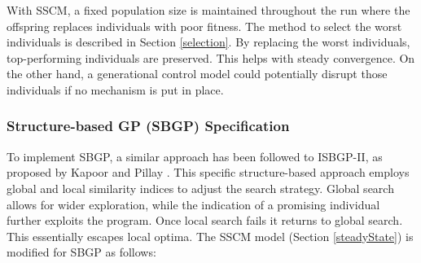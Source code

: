 \documentclass{article}
\begin{document}
With SSCM, a fixed population size is maintained throughout the run where the offspring replaces individuals with poor fitness. The method to select the worst individuals is described in Section \ref{selection}. By replacing the worst individuals, top-performing individuals are preserved. This helps with steady convergence. On the other hand, a generational control model could potentially disrupt those individuals if no mechanism is put in place.

\subsubsection{Structure-based GP (SBGP) Specification}
To implement SBGP, a similar approach has been followed to ISBGP-II, as proposed by Kapoor and Pillay \cite{kapoor_genetic_2024}. This specific structure-based approach employs global and local similarity indices to adjust the search strategy. Global search allows for wider exploration, while the indication of a promising individual further exploits the program. Once local search fails it returns to global search. This essentially escapes local optima. The SSCM model (Section \ref{steadyState}) is modified for SBGP as follows:
\end{document}
